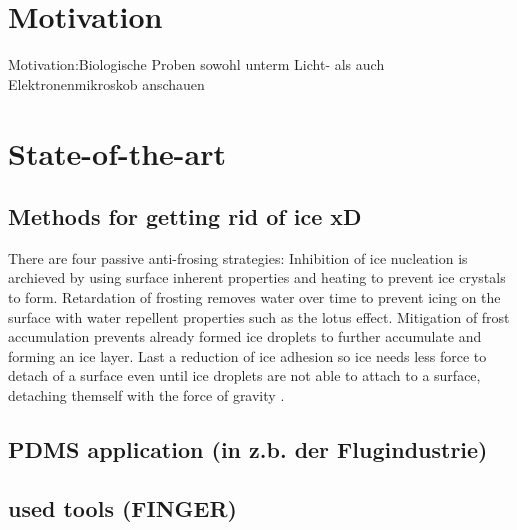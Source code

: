 \section{Motivation}
Motivation:Biologische Proben sowohl unterm Licht- als auch Elektronenmikroskob anschauen

\section{State-of-the-art}

\subsection{Methods for getting rid of ice xD}

There are four passive anti-frosing strategies: Inhibition of ice nucleation is archieved by using surface inherent properties and heating to prevent ice crystals to form. Retardation of frosting removes water over time to prevent icing on the surface with water repellent properties such as the lotus effect. Mitigation of frost accumulation prevents already formed ice droplets to further accumulate and forming an ice layer. Last a reduction of ice adhesion so ice needs less force to detach of a surface even until ice droplets are not able to attach to a surface, detaching themself with the force of gravity \cite{Yang.2021}. 

\subsection{PDMS application (in z.b. der Flugindustrie)}

\subsection{used tools (FINGER)}

